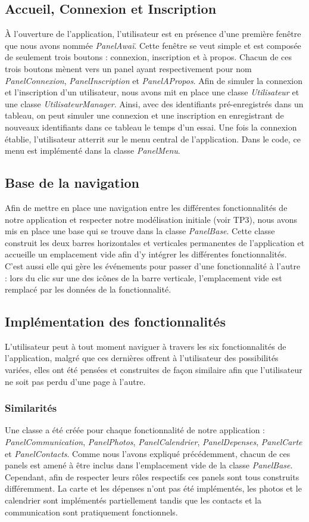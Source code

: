\documentclass[11pt]{article}
\begin{document}
\subsection{Accueil, Connexion et Inscription}
À l'ouverture de l'application, l'utilisateur est en présence d'une première fenêtre que nous avons nommée \textit{PanelAwaï}. Cette fenêtre se veut simple et est composée de seulement trois boutons : connexion, inscription et à propos. Chacun de ces trois boutons mènent vers un panel ayant respectivement pour nom \textit{PanelConnexion}, \textit{PanelInscription} et \textit{PanelAPropos}. Afin de simuler la connexion et l'inscription d'un utilisateur, nous avons mit en place une classe \textit{Utilisateur} et une classe \textit{UtilisateurManager}. Ainsi, avec des identifiants pré-enregistrés dans un tableau, on peut simuler une connexion et une inscription en enregistrant de nouveaux identifiants dans ce tableau le temps d'un essai. Une fois la connexion établie, l'utilisateur atterrit sur le menu central de l'application. Dans le code, ce menu est implémenté dans la classe \textit{PanelMenu}.

\subsection{Base de la navigation}
Afin de mettre en place une navigation entre les différentes fonctionnalités de notre application et respecter notre modélisation initiale (voir TP3), nous avons mis en place une base qui se trouve dans la classe \textit{PanelBase}. Cette classe construit les deux barres horizontales et verticales permanentes de l'application et accueille un emplacement vide afin d'y intégrer les différentes fonctionnalités. C'est aussi elle qui gère les événements pour passer d'une fonctionnalité à l'autre : lors du clic sur une des icônes de la barre verticale, l'emplacement vide est remplacé par les données de la fonctionnalité.

\subsection{Implémentation des fonctionnalités}
L'utilisateur peut à tout moment naviguer à travers les six fonctionnalités de l'application, malgré que ces dernières offrent à l'utilisateur des possibilités variées, elles ont été pensées et construites de façon similaire afin que l'utilisateur ne soit pas perdu d'une page à l'autre. 
\subsubsection{Similarités}
Une classe a été créée pour chaque fonctionnalité de notre application : \textit{PanelCommunication}, \textit{PanelPhotos}, \textit{PanelCalendrier}, \textit{PanelDepenses}, \textit{PanelCarte} et \textit{PanelContacts}. Comme nous l'avons expliqué précédemment, chacun de ces panels est amené à être inclus dans l'emplacement vide de la classe \textit{PanelBase}. Cependant, afin de respecter leurs rôles respectifs ces panels sont tous construits différemment. La carte et les dépenses n'ont pas été implémentés, les photos et le calendrier sont implémentés partiellement tandis que les contacts et la communication sont pratiquement fonctionnels.
\end{document}
